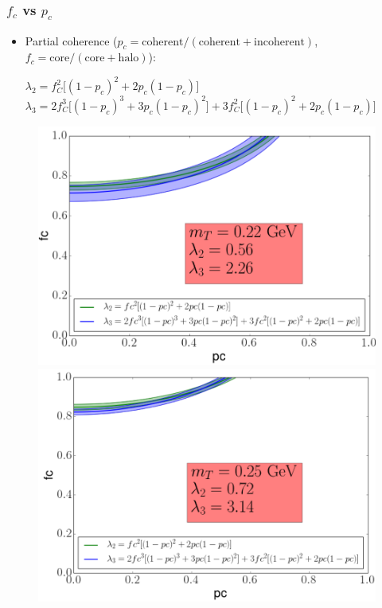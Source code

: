 \documentclass{beamer}
\begin{document}
\begin{frame}
\frametitle{$f_c$ vs $p_c$}
\begin{itemize}
\item Partial coherence ($p_c=\mathrm{coherent}/(\mathrm{coherent}+\mathrm{incoherent})$, $f_c=\mathrm{core}/(\mathrm{core}+\mathrm{halo})$):

 
$\lambda_2=f_C^2\big[(1-p_c)^2+2p_c(1-p_c)\big]$
$\lambda_3=2f_C^3\big[(1-p_c)^3+3p_c(1-p_c)^2\big]+3f_C^2\big[(1-p_c)^2+2p_c(1-p_c)\big]$
\end{itemize}
\begin{figure}
\includegraphics[scale=0.2]{pic/fcpc/5}
\includegraphics[scale=0.2]{pic/fcpc/9}\\

\end{figure}
\end{frame}
\end{document}

